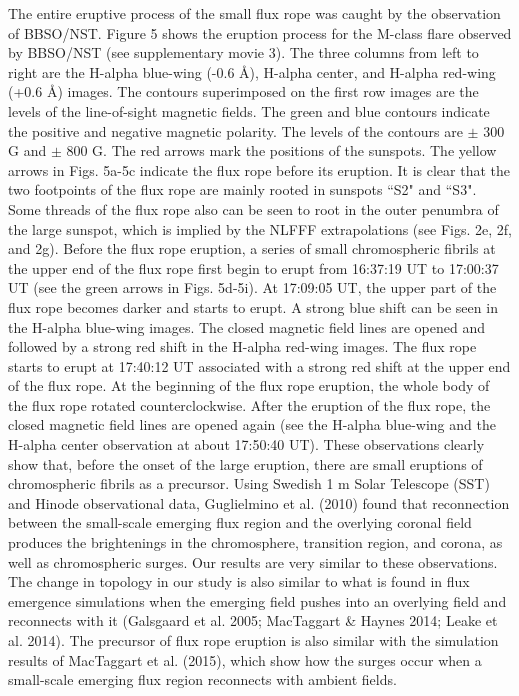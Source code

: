\documentclass[12pt,preprint]{aastex}
\begin{document}
\begin{CJK*}{UTF8}{gbsn}
The entire eruptive process of the small flux rope was caught by the observation of BBSO/NST. Figure 5 shows the eruption process for the M-class flare observed by BBSO/NST (see supplementary movie 3). The three columns from left to right are the H-alpha blue-wing (-0.6 \AA), H-alpha center, and H-alpha red-wing (+0.6 \AA) images. The contours superimposed on the first row images are the levels of the line-of-sight magnetic fields. The green and blue contours indicate the positive and negative magnetic polarity. The levels of the contours are $\pm$ 300 G and $\pm$ 800 G. The red arrows mark the positions of the sunspots. The yellow arrows in Figs. 5a-5c indicate the flux rope before its eruption. It is clear that the two footpoints of the flux rope are mainly rooted in sunspots ``S2" and ``S3". Some threads of the flux rope also can be seen to root in the outer penumbra of the large sunspot, which is implied by the NLFFF extrapolations (see Figs. 2e, 2f, and 2g). Before the flux rope eruption, a series of small chromospheric fibrils at the upper end of the flux rope first begin to erupt from 16:37:19 UT to 17:00:37 UT (see the green arrows in Figs. 5d-5i).  At 17:09:05 UT, the upper part of the flux rope becomes darker and starts to erupt. A strong blue shift can be seen in the H-alpha blue-wing images. The closed magnetic field lines are opened and followed by a strong red shift in the H-alpha red-wing images. The flux rope starts to erupt at 17:40:12 UT associated with a strong red shift at the upper end of the flux rope. At the beginning of the flux rope eruption, the whole body of the flux rope rotated counterclockwise. After the eruption of the flux rope, the closed magnetic field lines are opened again (see the H-alpha blue-wing and the H-alpha center observation at about 17:50:40 UT). These observations clearly show that, before the onset of the large eruption, there are small eruptions of chromospheric fibrils as a precursor. Using Swedish 1 m Solar Telescope (SST) and Hinode observational data, Guglielmino et al. (2010) found that reconnection between the small-scale emerging flux region and the overlying coronal field produces the brightenings in the chromosphere, transition region, and corona, as well as chromospheric surges. Our results are very similar to these observations. The change in topology in our study is also similar to what is found in flux emergence simulations when the emerging field pushes into an overlying field and reconnects with it (Galsgaard et al. 2005; MacTaggart \& Haynes 2014; Leake et al. 2014). The precursor of flux rope eruption is also similar with the simulation results of MacTaggart et al. (2015), which show how the surges occur when a small-scale emerging flux region reconnects with ambient fields.


\end{CJK*}
\end{document}
